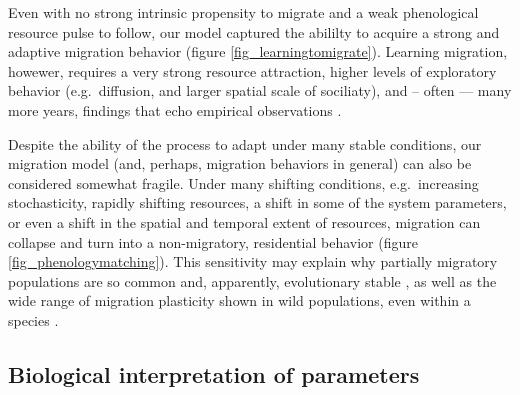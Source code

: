 \documentclass[utf8]{frontiersSCNS} %
\begin{document}
	Even with no strong intrinsic propensity to migrate and a weak phenological resource pulse to follow, our model captured the abililty to acquire a strong and adaptive migration behavior (figure \ref{fig_learningtomigrate}).  Learning migration, howewer, requires a very strong resource attraction, higher levels of exploratory behavior (e.g.~diffusion, and larger spatial scale of sociliaty), and -- often --- many more years, findings that echo empirical observations \citep{Jesmer2018}. 
	
	Despite the ability of the process to adapt under many stable conditions, our migration model (and, perhaps, migration behaviors in general) can also be considered somewhat fragile. Under many shifting conditions, e.g.~increasing stochasticity, rapidly shifting resources, a shift in some of the system parameters, or even a shift in the spatial and temporal extent of resources, migration can collapse and turn into a non-migratory, residential behavior (figure \ref{fig_phenologymatching}). This sensitivity may explain why partially migratory populations are so common and, apparently, evolutionary stable \citep{Berthold1999, Chapman2011}, as well as the wide range of migration plasticity shown in wild populations, even within a species \citep{Xu2021}.
	
	
\subsection{Biological interpretation of parameters}
	
	
\end{document}
